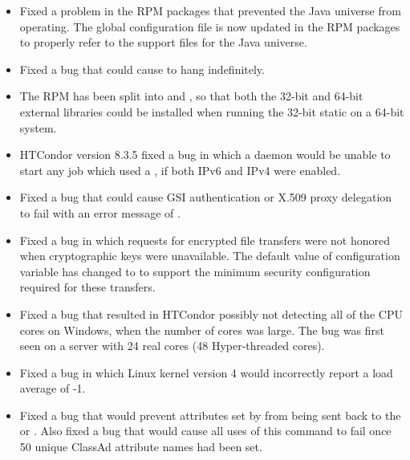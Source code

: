\begin{itemize}

\item Fixed a problem in the RPM packages that prevented the
Java universe from operating.
The global configuration file is now updated in the RPM packages
to properly refer to the support files for the Java universe.

\item Fixed a bug that could cause  to hang
indefinitely.

\item The  RPM has been split into
 and ,
so that both the 32-bit and 64-bit external
libraries could be installed when running the 32-bit static 
on a 64-bit system.

\item HTCondor version 8.3.5 fixed a bug in which 
a  daemon would be unable to start
any job which used a , if both IPv6 and IPv4 were enabled.

\item Fixed a bug that could cause GSI authentication or X.509 proxy
delegation to fail with an error message of
.

\item Fixed a bug in which requests for encrypted file transfers were not 
honored when cryptographic keys were unavailable.
The default value of configuration variable
has changed to 
to support the minimum security configuration required for these transfers.

\item Fixed a bug that resulted in HTCondor possibly not detecting all of 
the CPU cores on Windows, when the number of cores was large. 
The bug was first seen on a server with 24 real cores (48 Hyper-threaded cores).

\item Fixed a bug in which Linux kernel version 4 would incorrectly report
a load average of -1.

\item Fixed a bug that would prevent attributes set by 
 
from being sent back to the  or . 
Also fixed a bug that would cause all uses of this  command 
to fail once 50 unique ClassAd attribute names had been set.


\end{itemize}
